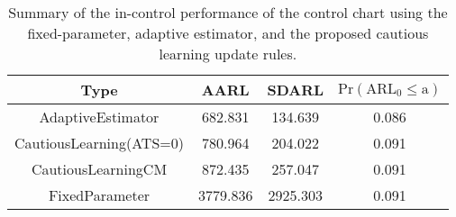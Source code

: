 \begin{table}[!h]

\caption{Summary of the in-control performance of the control chart using the fixed-parameter, adaptive estimator, and the proposed cautious learning update rules.}
\centering
\begin{tabular}[t]{cccc}
\toprule
Type & AARL & SDARL & $\text{Pr}(\text{ARL}_0 \leq \text{a})$\\
\midrule
AdaptiveEstimator & 682.831 & 134.639 & 0.086\\
CautiousLearning(ATS=0) & 780.964 & 204.022 & 0.091\\
CautiousLearningCM & 872.435 & 257.047 & 0.091\\
FixedParameter & 3779.836 & 2925.303 & 0.091\\
\bottomrule
\end{tabular}
\end{table}
